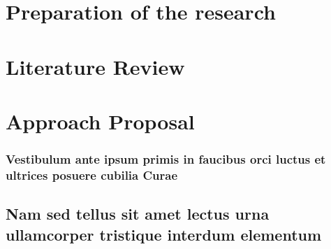 \documentclass[
	12pt,				%
	openright,			%
	twoside,			%
	a4paper,			%
	english,			%
	french,				%
	spanish,			%
	brazil				%
	]{abntex2}
\begin{document}
\part{Preparation of the research}


%

\part{Literature Review}





\part{Approach Proposal}


\section{Vestibulum ante ipsum primis in faucibus orci luctus et ultrices
posuere cubilia Curae}

\lipsum[21-22]

\chapter{Nam sed tellus sit amet lectus urna ullamcorper tristique interdum
elementum}
\end{document}
